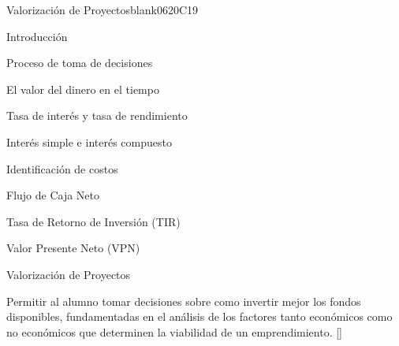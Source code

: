 \begin{syllabus}
\begin{unit}{}{Valorización de Proyectos}{blank06}{20}{C19}
\begin{topics}
      \item Introducción
       \item Proceso de toma de decisiones
       \item El valor del dinero en el tiempo
       \item Tasa de interés y tasa de rendimiento
       \item Interés simple e interés compuesto
       \item Identificación de costos
       \item Flujo de Caja Neto
       \item Tasa de Retorno de Inversión (TIR)
      \item Valor Presente Neto (VPN)
       \item Valorización de Proyectos
   \end{topics}
   \begin{learningoutcomes}
      \item Permitir al alumno tomar decisiones sobre como invertir mejor los fondos disponibles, fundamentadas en el análisis de los factores tanto económicos como no económicos que determinen la viabilidad de un emprendimiento. [\Assessment]
   \end{learningoutcomes}
\end{unit}


\end{syllabus}
